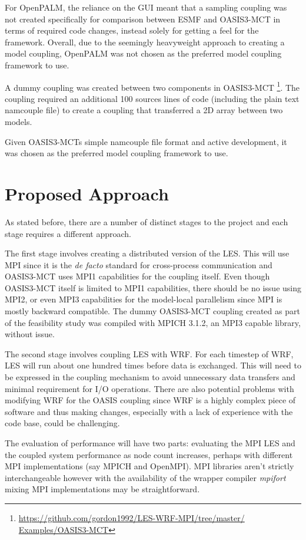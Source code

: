 \documentclass{acm_proc_article-sp}
\begin{document}
For OpenPALM, the reliance on the GUI meant that a sampling coupling was not
created specifically for comparison between ESMF and OASIS3-MCT in terms of
required code changes, instead solely for getting a feel for the framework.
Overall, due to the seemingly heavyweight approach to creating a model coupling,
OpenPALM was not chosen as the preferred model coupling framework to use.

A dummy coupling was created between two components in OASIS3-MCT
\footnote{\url{https://github.com/gordon1992/LES-WRF-MPI/tree/master/
Examples/OASIS3-MCT}}. The coupling required an additional 100 sources lines of
code (including the plain text namcouple file) to create a coupling that
transferred a 2D array between two models.

Given OASIS3-MCTs simple namcouple file format and active development, it was
chosen as the preferred model coupling framework to use.

\section{Proposed Approach}

As stated before, there are a number of distinct stages to the project and each
stage requires a different approach.

The first stage involves creating a distributed version of the LES. This will
use MPI since it is the \textit{de facto} standard for cross-process
communication and OASIS3-MCT uses MPI1 capabilities for the coupling itself.
Even though OASIS3-MCT itself is limited to MPI1 capabilities, there should be
no issue using MPI2, or even MPI3 capabilities for the model-local parallelism
since MPI is mostly backward compatible. The dummy OASIS3-MCT coupling created
as part of the feasibility study was compiled with MPICH 3.1.2, an MPI3 capable
library, without issue.

The second stage involves coupling LES with WRF. For each timestep of WRF, LES
will run about one hundred times before data is exchanged. This will need to be
expressed in the coupling mechanism to avoid unnecessary data transfers and
minimal requirement for I/O operations. There are also potential problems with
modifying WRF for the OASIS coupling since WRF is a highly complex piece of
software and thus making changes, especially with a lack of experience with the
code base, could be challenging.

The evaluation of performance will have two parts: evaluating the MPI LES and
the coupled system performance as node count increases, perhaps with different
MPI implementations (say MPICH and OpenMPI). MPI libraries aren't strictly
interchangeable however with the availability of the wrapper compiler
\textit{mpifort} mixing MPI implementations may be straightforward.
\end{document}
